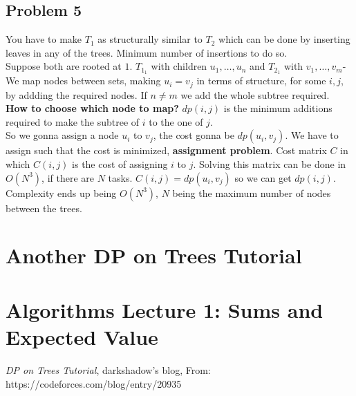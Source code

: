 \documentclass{IEEEtran}
\begin{document}
        \subsection{Problem 5}
            You have to make $T_1$ as structurally similar to $T_2$ which can be done by inserting leaves in any of the trees. Minimum number of insertions to do so.\\
            Suppose both are rooted at $1$. $T_{1_1}$ with children $u_1,\ldots,u_n$ and $T_{2_1}$ with $v_1,\ldots,v_m$- We map nodes between sets, making $u_i = v_j$ in terms of structure, for some $i,j$, by addding the required nodes. If $n\neq m$ we add the whole subtree required.\\
            \textbf{How to choose which node to map?} $dp(i,j)$ is the minimum additions required to make the subtree of $i$ to the one of $j$.\\
            So we gonna assign a node $u_i$ to $v_j$, the cost gonna be $dp(u_i,v_j)$. We have to assign such that the cost is minimized, \textbf{assignment problem}. Cost matrix $C$ in which $C(i,j)$ is the cost of assigning $i$ to $j$. Solving this matrix can be done in $O(N^3)$, if there are $N$ tasks. $C(i,j) = dp(u_i,v_j)$ so we can get $dp(i,j)$.\\
            Complexity ends up being $O(N^3)$, $N$ being the maximum number of nodes between the trees.
        
    \section{Another DP on Trees Tutorial}

    \section{Algorithms Lecture 1: Sums and Expected Value}

    \begin{thebibliography}{}
            \textit{DP on Trees Tutorial},
            darkshadow's blog,
            From: https://codeforces.com/blog/entry/20935
    \end{thebibliography}
\end{document}
